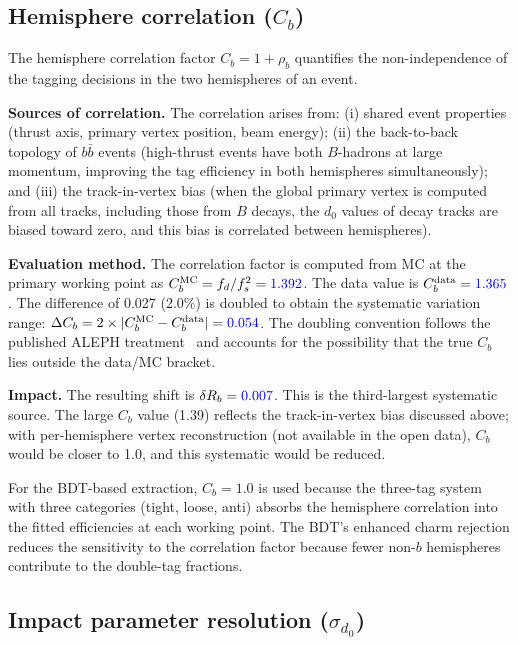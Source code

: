 \documentclass[11pt,a4paper]{article}
\newcommand{\measured}[1]{\textcolor{blue}{#1}}
\begin{document}
\subsection{Hemisphere correlation ($C_b$)}
\label{sec:syst-cb}

The hemisphere correlation factor $C_b = 1 + \rho_b$ quantifies the
non-independence of the tagging decisions in the two hemispheres of an
event.

\textbf{Sources of correlation.}
The correlation arises from: (i) shared event properties (thrust axis,
primary vertex position, beam energy); (ii) the back-to-back topology
of $b\bar{b}$ events (high-thrust events have both $B$-hadrons at large
momentum, improving the tag efficiency in both hemispheres simultaneously);
and (iii) the track-in-vertex bias (when the global primary vertex is
computed from all tracks, including those from $B$ decays, the $d_0$
values of decay tracks are biased toward zero, and this bias is correlated
between hemispheres).

\textbf{Evaluation method.}
The correlation factor is computed from MC at the primary working point
as $C_b^\mathrm{MC} = f_d / f_s^2 = \measured{1.392}$.  The data value
is $C_b^\mathrm{data} = \measured{1.365}$.  The difference of 0.027
(2.0\%) is doubled to obtain the systematic variation range:
$\Delta C_b = 2 \times |C_b^\mathrm{MC} - C_b^\mathrm{data}| =
\measured{0.054}$.  The doubling convention follows the published ALEPH
treatment~\cite{ALEPH:Rb:1996} and accounts for the possibility that the
true $C_b$ lies outside the data/MC bracket.

\textbf{Impact.}
The resulting shift is $\delta R_b = \measured{0.007}$.  This is the
third-largest systematic source.  The large $C_b$ value (1.39) reflects
the track-in-vertex bias discussed above; with per-hemisphere vertex
reconstruction (not available in the open data), $C_b$ would be closer
to 1.0, and this systematic would be reduced.

For the BDT-based extraction, $C_b = 1.0$ is used because the three-tag
system with three categories (tight, loose, anti) absorbs the hemisphere
correlation into the fitted efficiencies at each working point.  The
BDT's enhanced charm rejection reduces the sensitivity to the correlation
factor because fewer non-$b$ hemispheres contribute to the double-tag
fractions.

\subsection{Impact parameter resolution ($\sigma_{d_0}$)}
\label{sec:syst-sigma-d0}
\end{document}
